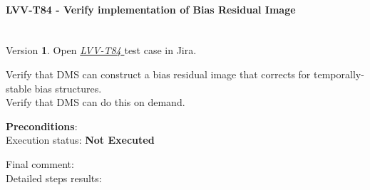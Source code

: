 \documentclass[DM,lsstdraft,STR,toc]{lsstdoc}
\begin{document}
\paragraph{ LVV-T84 - Verify implementation of Bias Residual Image }\mbox{}\\

Version \textbf{1}.
Open  \href{https://jira.lsstcorp.org/secure/Tests.jspa#/testCase/LVV-T84}{\textit{ LVV-T84 } }
test case in Jira.

Verify that DMS can construct a bias residual image that corrects for
temporally-stable bias structures.\\
Verify that DMS can do this on demand.

\textbf{ Preconditions}:\\


Execution status: {\bf Not Executed }

Final comment:\\


Detailed steps results:
\end{document}
